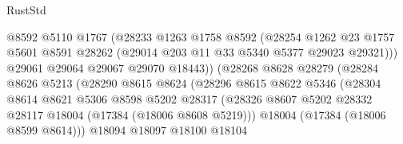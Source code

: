 \begin{lexlean}{RustStd}
\begin{coremodule}
                                      @8592
                                      @5110
                                      @1767
                                      (@28233
                                        @1263
                                        @1758
                                        @8592
                                        (@28254
                                          @1262
                                          @23
                                          @1757
                                          @5601
                                          @8591
                                          @28262
                                          (@29014 @203 @11 @33 @5340 @5377 @29023 @29321)))
                                      @29061
                                      @29064
                                      @29067
                                      @29070
                                      @18443))
                                  (@28268
                                    @8628
                                    @28279
                                    (@28284
                                      @8626
                                      @5213
                                      (@28290
                                        @8615
                                        @8624
                                        (@28296
                                          @8615
                                          @8622
                                          @5346
                                          (@28304
                                            @8614
                                            @8621
                                            @5306
                                            @8598
                                            @5202
                                            @28317
                                            (@28326
                                              @8607
                                              @5202
                                              @28332
                                              @28117
                                              @18004
                                              (@17384 (@18006 @8608 @5219)))
                                            @18004
                                            (@17384 (@18006 @8599 @8614)))
                                          @18094
                                          @18097
                                          @18100
                                          @18104

\end{coremodule}
\end{lexlean}
